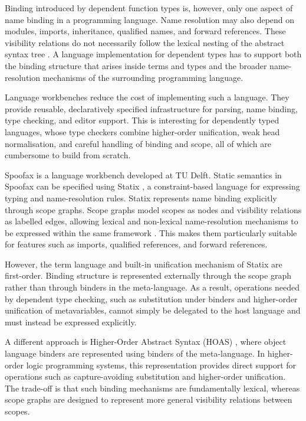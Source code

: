 Binding introduced by dependent function types is, however, only one aspect of
name binding in a programming language. Name resolution may also depend on
modules, imports, inheritance, qualified names, and forward references. These
visibility relations do not necessarily follow the lexical nesting of the
abstract syntax tree
\autocite{4bf44aa1779c4a968c555e1b54e16119,neron_extensible_2015}. A language
implementation for dependent types has to support both the binding
structure that arises inside terms and types and the broader name-resolution
mechanisms of the surrounding programming language.

Language workbenches \autocite{erdweg_evaluating_2015} reduce the cost of implementing such a language. They provide reusable, declaratively specified infrastructure for parsing, name binding, type checking, and editor support. This is interesting for dependently typed languages, whose type checkers combine higher-order unification, weak head normalisation, and careful handling of binding and scope, all of which are cumbersome to build from scratch.

Spoofax \cite{6898704} is a language workbench developed at TU Delft.
Static semantics in Spoofax can be specified using Statix \cite{van_antwerpen_scopes_2018},
a constraint-based language for expressing typing and name-resolution rules.
Statix represents name binding explicitly through scope graphs. Scope graphs
model scopes as nodes and visibility relations as labelled edges, allowing
lexical and non-lexical name-resolution mechanisms to be expressed within the
same framework \cite{van_antwerpen_scopes_2018}. This makes them particularly suitable for
features such as imports, qualified references, and forward references.

However, the term language and built-in unification mechanism of Statix are
first-order. Binding structure is represented externally through the scope
graph rather than through binders in the meta-language. As a result,
operations needed by dependent type checking, such as substitution under
binders and higher-order unification of metavariables, cannot simply be
delegated to the host language and must instead be expressed explicitly.

A different approach is Higher-Order Abstract Syntax (HOAS)
\cite{pfenning_higher-order_nodate}, where object language binders are represented using
binders of the meta-language. In higher-order logic programming systems, this
representation provides direct support for operations such as capture-avoiding
substitution and higher-order unification. The trade-off is that such binding
mechanisms are fundamentally lexical, whereas scope graphs are designed to
represent more general visibility relations between scopes.

